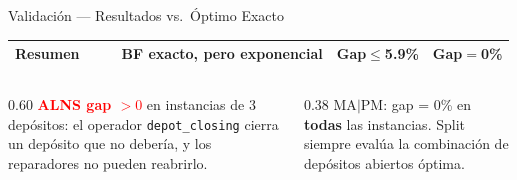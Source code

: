 \documentclass[aspectratio=169,10pt]{beamer}
\begin{document}
\begin{frame}{Validación --- Resultados vs.\ Óptimo Exacto}
\begin{center}
\begin{tabular}{lrr|rr|rr}
    \midrule
    \textbf{Resumen} & & &
    \multicolumn{2}{l|}{BF exacto, pero exponencial} &
    Gap$\leq$5.9\% & Gap$=$0\% \\
    \bottomrule
  \end{tabular}
  \end{center}
  \vspace{0.2em}
  \begin{columns}[onlytextwidth]
    \begin{column}{0.60\textwidth}
      \small\textcolor{red}{\textbf{ALNS gap $>0$}} en instancias de 3 depósitos:
      el operador \texttt{depot\_closing} cierra un depósito que no debería,
      y los reparadores no pueden reabrirlo.
    \end{column}
    \begin{column}{0.38\textwidth}
      \small MA$|$PM: gap = 0\% en \textbf{todas} las instancias.
      Split siempre evalúa la combinación de depósitos abiertos óptima.
    \end{column}
  \end{columns}
\end{frame}
\end{document}
